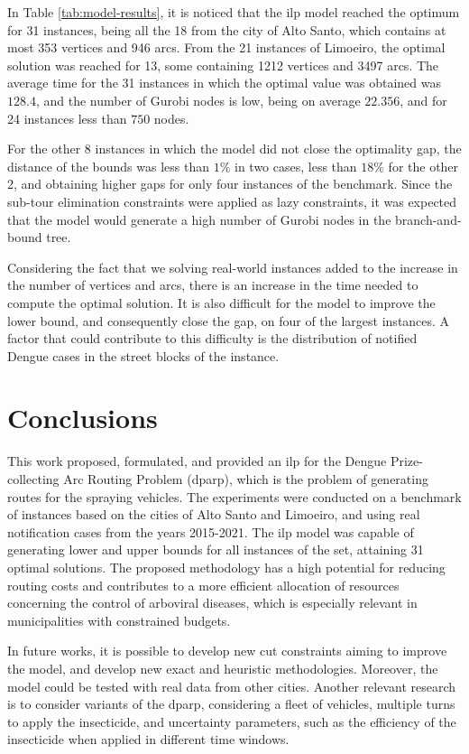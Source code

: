 \documentclass[a4paper,11pt]{article}
\begin{document}
In Table \ref{tab:model-results}, it is noticed that the \gls{ilp} model reached
the optimum  for 31 instances,  being all  the 18 from  the city of  Alto Santo,
which contains  at most  353 vertices  and 946  arcs. From  the 21  instances of
Limoeiro, the optimal solution was reached for 13, some containing 1212 vertices
and 3497 arcs. The average time for  the 31 instances in which the optimal value
was  obtained was  $128.4$, and  the number  of Gurobi  nodes is  low, being  on
average $22.356$, and for 24 instances less than $750$ nodes.

For the other 8  instances in which the model did not  close the optimality gap,
the distance of  the bounds was less  than $1\%$ in two cases,  less than $18\%$
for  the other  2, and  obtaining higher  gaps for  only four  instances of  the
benchmark.  Since the  sub-tour  elimination constraints  were  applied as  lazy
constraints, it  was expected  that the  model would generate  a high  number of
Gurobi nodes in the branch-and-bound tree.

Considering the fact that we solving  real-world instances added to the increase
in the number of  vertices and arcs, there is an increase in  the time needed to
compute the optimal solution. It is also  difficult for the model to improve the
lower bound, and consequently close the gap, on four of the largest instances. A
factor that could contribute to this  difficulty is the distribution of notified
Dengue cases in the street blocks of the instance.

\newpage
\section{Conclusions} \label{sec:conclusions}

This  work  proposed, formulated,  and  provided  an  \gls{ilp} for  the  Dengue
Prize-collecting  Arc Routing  Problem (\gls{dparp}),  which is  the problem  of
generating routes for the spraying vehicles. The experiments were conducted on a
benchmark of instances based on the cities of Alto Santo and Limoeiro, and using
real  notification cases  from  the  years 2015-2021.  The  \gls{ilp} model  was
capable  of generating  lower and  upper bounds  for all  instances of  the set,
attaining 31  optimal solutions. The  proposed methodology has a  high potential
for reducing  routing costs and  contributes to  a more efficient  allocation of
resources  concerning the  control of  arboviral diseases,  which is  especially
relevant in municipalities with constrained budgets.

In future works, it is possible to develop new cut constraints aiming to improve
the  model, and  develop new  exact and  heuristic methodologies.  Moreover, the
model  could be  tested  with  real data  from  other  cities. Another  relevant
research is  to consider  variants of  the \gls{dparp},  considering a  fleet of
vehicles, multiple turns  to apply the insecticide,  and uncertainty parameters,
such  as the  efficiency  of  the insecticide  when  applied  in different  time
windows.

~\\


\end{document}
